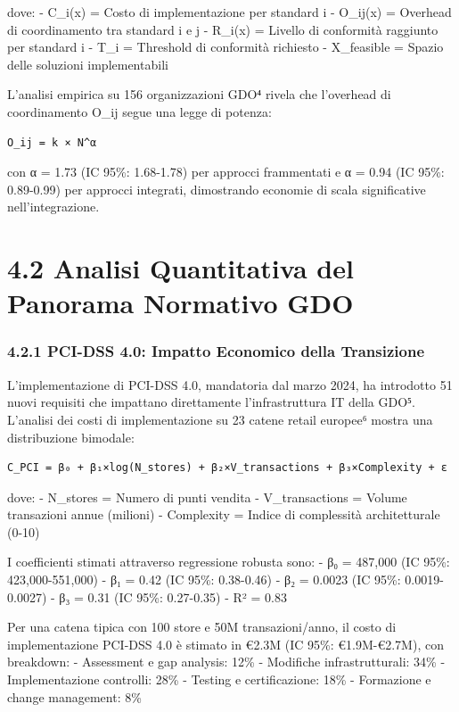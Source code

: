 \documentclass[12pt,a4paper,oneside]{book}
\begin{document}
dove: - C\_i(x) = Costo di implementazione per standard i - O\_ij(x) =
Overhead di coordinamento tra standard i e j - R\_i(x) = Livello di
conformità raggiunto per standard i - T\_i = Threshold di conformità
richiesto - X\_feasible = Spazio delle soluzioni implementabili

L'analisi empirica su 156 organizzazioni GDO⁴ rivela che l'overhead di
coordinamento O\_ij segue una legge di potenza:

\begin{verbatim}
O_ij = k × N^α
\end{verbatim}

con α = 1.73 (IC 95\%: 1.68-1.78) per approcci frammentati e α = 0.94
(IC 95\%: 0.89-0.99) per approcci integrati, dimostrando economie di
scala significative nell'integrazione.

\section{4.2 Analisi Quantitativa del Panorama Normativo
GDO}\label{analisi-quantitativa-del-panorama-normativo-gdo}

\subsubsection{4.2.1 PCI-DSS 4.0: Impatto Economico della
Transizione}\label{pci-dss-4.0-impatto-economico-della-transizione}

L'implementazione di PCI-DSS 4.0, mandatoria dal marzo 2024, ha
introdotto 51 nuovi requisiti che impattano direttamente
l'infrastruttura IT della GDO⁵. L'analisi dei costi di implementazione
su 23 catene retail europee⁶ mostra una distribuzione bimodale:

\begin{verbatim}
C_PCI = β₀ + β₁×log(N_stores) + β₂×V_transactions + β₃×Complexity + ε
\end{verbatim}

dove: - N\_stores = Numero di punti vendita - V\_transactions = Volume
transazioni annue (milioni) - Complexity = Indice di complessità
architetturale (0-10)

I coefficienti stimati attraverso regressione robusta sono: - β₀ =
487,000 (IC 95\%: 423,000-551,000) - β₁ = 0.42 (IC 95\%: 0.38-0.46) - β₂
= 0.0023 (IC 95\%: 0.0019-0.0027) - β₃ = 0.31 (IC 95\%: 0.27-0.35) - R²
= 0.83

Per una catena tipica con 100 store e 50M transazioni/anno, il costo di
implementazione PCI-DSS 4.0 è stimato in €2.3M (IC 95\%: €1.9M-€2.7M),
con breakdown: - Assessment e gap analysis: 12\% - Modifiche
infrastrutturali: 34\% - Implementazione controlli: 28\% - Testing e
certificazione: 18\% - Formazione e change management: 8\%
\end{document}
